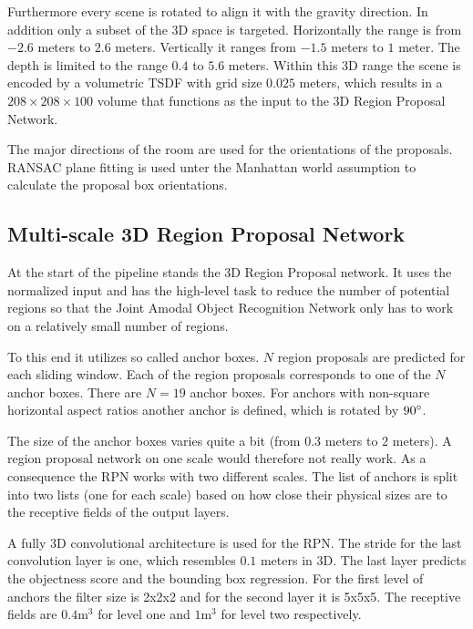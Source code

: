\documentclass[12pt]{scrartcl}
\begin{document}
Furthermore every scene is rotated to align it with the gravity direction.
In addition only a subset of the 3D space is targeted. Horizontally the range
is from \(-2.6\) meters to \(2.6\) meters. Vertically it ranges from \(-1.5\)
meters to \(1\) meter. The depth is limited to the range \(0.4\) to \(5.6\)
meters. Within this 3D range the scene is encoded by a volumetric TSDF with
grid size \(0.025\) meters, which results in a \(208 \times 208 \times 100\)
volume that functions as the input to the 3D Region Proposal Network.

The major directions of the room are used for the orientations of the proposals.
RANSAC plane fitting is used unter the Manhattan world assumption to calculate
the proposal box orientations.

\subsection{Multi-scale 3D Region Proposal Network}

At the start of the pipeline stands the 3D Region Proposal network. It uses the
normalized input and has the high-level task to reduce the number of potential
regions so that the Joint Amodal Object Recognition Network only has to work on
a relatively small number of regions.

To this end it utilizes so called anchor boxes. \(N\) region proposals are predicted
for each sliding window. Each of the region proposals corresponds to one of the
\(N\) anchor boxes. There are \(N = 19\) anchor boxes. For anchors with non-square
horizontal aspect ratios another anchor is defined, which is rotated by \(90 \degree\).

The size of the anchor boxes varies quite a bit (from \(0.3\) meters to \(2\)
meters). A region proposal network on one scale would therefore not really work.
As a consequence the RPN works with two different scales. The list of anchors
is split into two lists (one for each scale) based on how close their physical
sizes are to the receptive fields of the output layers.

A fully 3D convolutional architecture is used for the RPN. The stride for the last
convolution layer is one, which resembles \(0.1\) meters in 3D. The last layer
predicts the objectness score and the bounding box regression. For the first level
of anchors the filter size is 2x2x2 and for the second layer it is 5x5x5. The
receptive fields are \(0.4 \text{m}^3\) for level one and \(1 \text{m}^3\) for
level two respectively.
\end{document}
